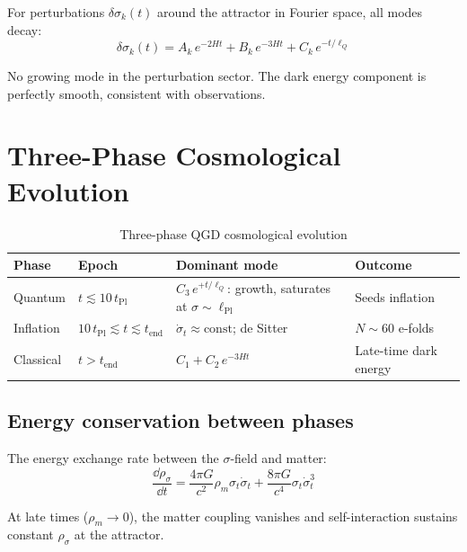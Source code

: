 \documentclass[11pt,a4paper]{article}
\theoremstyle{plain}
\theoremstyle{definition}
\theoremstyle{remark}
\newcommand{\lQ}{\ell_Q}
\begin{document}
For perturbations $\delta\sigma_k(t)$ around the attractor in Fourier space, all modes decay:
\begin{equation}
  \delta\sigma_k(t) = A_k\,e^{-2Ht} + B_k\,e^{-3Ht} + C_k\,e^{-t/\lQ}
\end{equation}

No growing mode in the perturbation sector.  The dark energy component is perfectly smooth, consistent with observations.

\section{Three-Phase Cosmological Evolution}
\label{sec:phases}

\begin{table}[h]
  \centering
  \caption{Three-phase QGD cosmological evolution}
  \begin{tabular}{@{}p{2cm}p{3.5cm}p{4.5cm}p{3.5cm}@{}}
    \toprule
    Phase & Epoch & Dominant mode & Outcome \\
    \midrule
    Quantum & $t \lesssim 10\,t_{\mathrm{Pl}}$ & $C_3\,e^{+t/\lQ}$: growth, saturates at $\sigma \sim \ell_{\mathrm{Pl}}$ & Seeds inflation \\[4pt]
    Inflation & $10\,t_{\mathrm{Pl}} \lesssim t \lesssim t_{\mathrm{end}}$ & $\dot\sigma_t \approx \mathrm{const}$; de Sitter & $N \sim 60$ e-folds \\[4pt]
    Classical & $t > t_{\mathrm{end}}$ & $C_1 + C_2\,e^{-3Ht}$ & Late-time dark energy \\
    \bottomrule
  \end{tabular}
\end{table}

\subsection{Energy conservation between phases}

The energy exchange rate between the $\sigma$-field and matter:
\begin{equation}
  \frac{\dd\rho_\sigma}{\dd t} = \frac{4\pi G}{c^2}\rho_m\sigma_t\dot\sigma_t + \frac{8\pi G}{c^4}\sigma_t\dot\sigma_t^3
\end{equation}

At late times ($\rho_m \to 0$), the matter coupling vanishes and self-interaction sustains constant $\rho_\sigma$ at the attractor.
\end{document}

